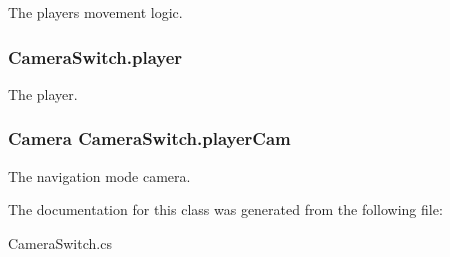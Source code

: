 The player\textquotesingle{}s movement logic. 

\subsubsection[{player}]{ Camera\+Switch.\+player}\label{class_camera_switch_aef916b4104b8334d1fa50e040f096356}


The player. 

\subsubsection[{player\+Cam}]{\setlength{\rightskip}{0pt plus 5cm}Camera Camera\+Switch.\+player\+Cam}\label{class_camera_switch_a83af59315c7f4a960ccd0cc618403072}


The navigation mode camera. 



The documentation for this class was generated from the following file\+:\begin{DoxyCompactItemize}
\item 
Camera\+Switch.\+cs\end{DoxyCompactItemize}
